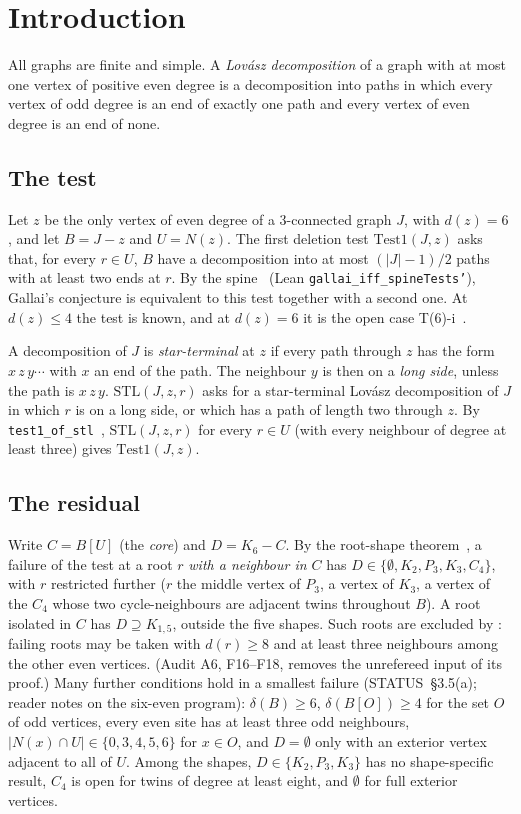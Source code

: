 \documentclass[11pt]{amsart}
\theoremstyle{definition}
\newcommand{\STL}{\mathrm{STL}}
\begin{document}
\section{Introduction}\label{sec:intro}

All graphs are finite and simple. A \emph{Lov\'asz decomposition} of a graph with at most one
vertex of positive even degree is a decomposition into paths in which every vertex of odd degree
is an end of exactly one path and every vertex of even degree is an end of none.

\subsection*{The test}
Let $z$ be the only vertex of even degree of a $3$-connected graph $J$, with $d(z)=6$, and let
$B=J-z$ and $U=N(z)$. The first deletion test $\mathrm{Test1}(J,z)$ asks that, for every
$r\in U$, $B$ have a decomposition into at most $(|J|-1)/2$ paths with at least two ends at
$r$. By the spine~\cite{SP} (Lean \texttt{gallai\_iff\_spineTests'}), Gallai's conjecture is
equivalent to this test together with a second one. At $d(z)\le4$ the test is known, and at
$d(z)=6$ it is the open case T(6)-i~\cite{RS,INC,MR}.

A decomposition of $J$ is \emph{star-terminal} at $z$ if every path through $z$ has the form
$x\,z\,y\cdots$ with $x$ an end of the path. The neighbour $y$ is then on a \emph{long side},
unless the path is $x\,z\,y$. $\STL(J,z,r)$ asks for a star-terminal Lov\'asz decomposition of
$J$ in which $r$ is on a long side, or which has a path of length two through $z$. By
\texttt{test1\_of\_stl}~\cite{STL}, $\STL(J,z,r)$ for every $r\in U$ (with every neighbour of
degree at least three) gives $\mathrm{Test1}(J,z)$.

\subsection*{The residual}
Write $C=B[U]$ (the \emph{core}) and $D=K_6-C$. By the root-shape theorem~\cite{RS}, a failure
of the test at a root $r$ \emph{with a neighbour in $C$} has $D\in\{\emptyset,K_2,P_3,K_3,C_4\}$,
with $r$ restricted further ($r$ the middle vertex of $P_3$, a vertex of $K_3$, a vertex of the
$C_4$ whose two cycle-neighbours are adjacent twins throughout $B$). A root isolated in $C$ has
$D\supseteq K_{1,5}$, outside the five shapes. Such roots are excluded by \cite[Thm~144]{MR}:
failing roots may be taken with $d(r)\ge8$ and at least three neighbours among the other even
vertices. (Audit A6, F16--F18, removes the unrefereed input of its proof.) Many further conditions hold in a smallest failure (STATUS~\S3.5(a);
reader notes on the six-even program): $\delta(B)\ge6$, $\delta(B[O])\ge4$ for the set $O$ of
odd vertices, every even site has at least three odd neighbours, $|N(x)\cap U|\in\{0,3,4,5,6\}$
for $x\in O$, and $D=\emptyset$ only with an exterior vertex adjacent to all of $U$. Among the
shapes, $D\in\{K_2,P_3,K_3\}$ has no shape-specific result, $C_4$ is open for twins of degree at
least eight, and $\emptyset$ for full exterior vertices.
\end{document}
